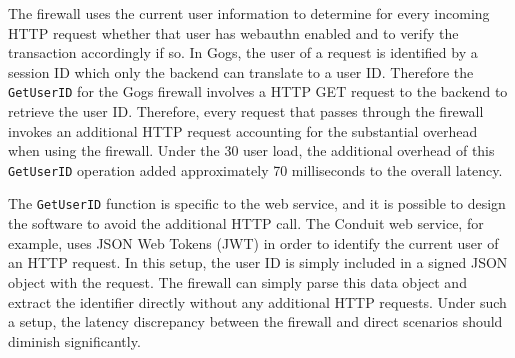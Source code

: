 The firewall uses the current user information to determine for every incoming HTTP request whether that user has webauthn enabled and to verify the transaction accordingly if so. In Gogs, the user of a request is identified by a session ID which only the backend can translate to a user ID. Therefore the \lstinline{GetUserID} for the Gogs firewall involves a HTTP GET request to the backend to retrieve the user ID. Therefore, every request that passes through the firewall invokes an additional HTTP request accounting for the substantial overhead when using the firewall. Under the 30 user load, the additional overhead of this \lstinline{GetUserID} operation added approximately 70 milliseconds to the overall latency.

The \lstinline{GetUserID} function is specific to the web service, and it is possible to design the software to avoid the additional HTTP call. The Conduit web service, for example, uses JSON Web Tokens (JWT) in order to identify the current user of an HTTP request. In this setup, the user ID is simply included in a signed JSON object with the request. The firewall can simply parse this data object and extract the identifier directly without any additional HTTP requests. Under such a setup, the latency discrepancy between the firewall and direct scenarios should diminish significantly.




